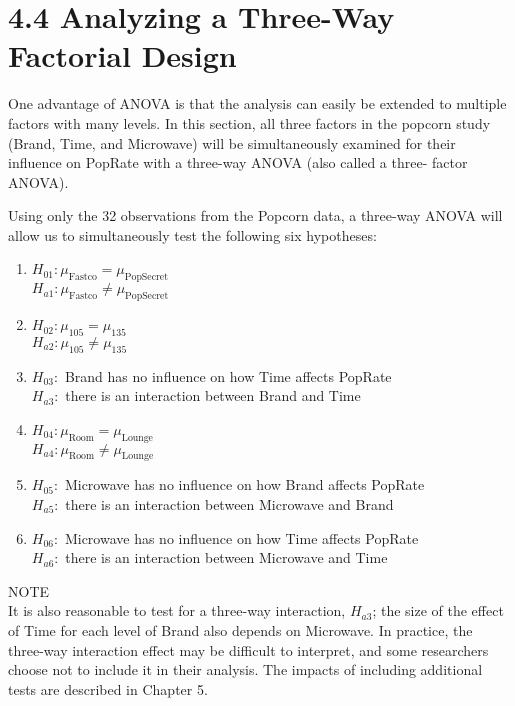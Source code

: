 \documentclass[
]{report}
\providecommand{\tightlist}{%
  \setlength{\itemsep}{0pt}\setlength{\parskip}{0pt}}
\theoremstyle{definition}
\theoremstyle{definition}
\theoremstyle{definition}
\theoremstyle{definition}
\theoremstyle{remark}
\begin{document}
\hypertarget{analyzing-a-three-way-factorial-design}{%
\section{4.4 Analyzing a Three-Way Factorial Design}\label{analyzing-a-three-way-factorial-design}}

One advantage of ANOVA is that the analysis can easily be extended to multiple factors with many levels. In this section, all three factors in the popcorn study (Brand, Time, and Microwave) will be simultaneously examined for their influence on PopRate with a three-way ANOVA (also called a three-
factor ANOVA).

Using only the 32 observations from the Popcorn data, a three-way ANOVA will allow us to simultaneously test the following six hypotheses:

\begin{enumerate}
\def\labelenumi{\arabic{enumi}.}
\tightlist
\item
  \(H_{01}: \mu_{\text{Fastco}} = \mu_{\text{PopSecret}}\)\\
  \(H_{a1}: \mu_{\text{Fastco}} \neq \mu_{\text{PopSecret}}\)\\
\item
  \(H_{02}: \mu_{105} = \mu_{135}\)\\
  \(H_{a2}: \mu_{105} \neq \mu_{135}\)\\
\item
  \(H_{03}:\) Brand has no influence on how Time affects PopRate\\
  \(H_{a3}:\) there is an interaction between Brand and Time\\
\item
  \(H_{04}: \mu_{\text{Room}} = \mu_{\text{Lounge}}\)\\
  \(H_{a4}: \mu_{\text{Room}} \neq \mu_{\text{Lounge}}\)\\
\item
  \(H_{05}:\) Microwave has no influence on how Brand affects PopRate\\
  \(H_{a5}:\) there is an interaction between Microwave and Brand\\
\item
  \(H_{06}:\) Microwave has no influence on how Time affects PopRate\\
  \(H_{a6}:\) there is an interaction between Microwave and Time
\end{enumerate}

NOTE\\
It is also reasonable to test for a three-way interaction, \(H_{a3}\); the size of the effect of Time for each level of Brand also depends on Microwave. In practice, the three-way interaction effect may be difficult to interpret, and some researchers choose not to include it in their analysis. The impacts of including additional tests are described in Chapter 5.
\end{document}
